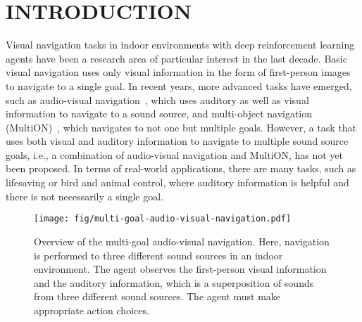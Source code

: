 \section{INTRODUCTION}

Visual navigation tasks in indoor environments with deep reinforcement learning agents have been a research area of particular interest in the last decade.
Basic visual navigation uses only visual information in the form of first-person images to navigate to a single goal.
In recent years, more advanced tasks have emerged, such as audio-visual navigation~\cite{chen2020soundspaces}, which uses auditory as well as visual information to navigate to a sound source, and multi-object navigation (MultiON)~\cite{wani2020multion}, which navigates to not one but multiple goals. 
However, a task that uses both visual and auditory information to navigate to multiple sound source goals, i.e., a combination of audio-visual navigation and MultiON, has not yet been proposed.
In terms of real-world applications, there are many tasks, such as lifesaving or bird and animal control, where auditory information is helpful and there is not necessarily a single goal.

\begin{figure}[t]
    \begin{center}
        \centering
        \texttt{[image: fig/multi-goal-audio-visual-navigation.pdf]}
        \caption{
            Overview of the multi-goal audio-visual navigation.
            Here, navigation is performed to three different sound sources in an indoor environment.
            The agent observes the first-person visual information and the auditory information, which is a superposition of sounds from three different sound sources. The agent must make appropriate action choices.
        }
        \label{fig:multi_goal_av_nav}
    \end{center}
\end{figure}

